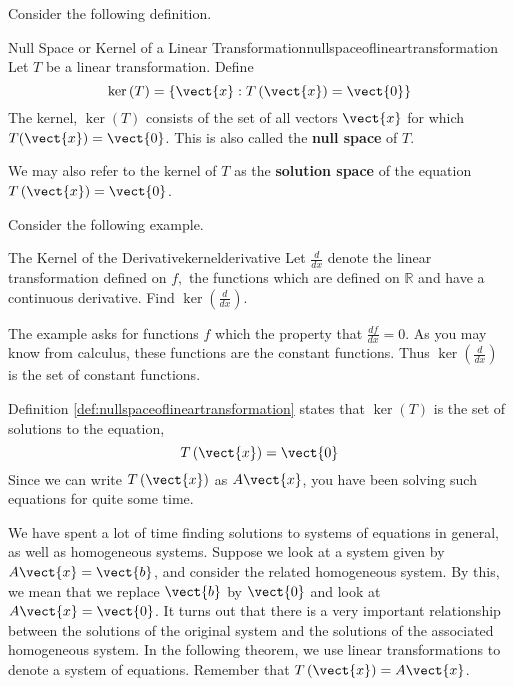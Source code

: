 Consider the following definition.

\begin{definition}{Null Space or Kernel of a Linear Transformation}{nullspaceoflineartransformation}
Let $T$ be a linear transformation. Define
\begin{equation*}
\ker \left( T\right) = \left\{ \vect{x}:T \left(\vect{x} \right)= \vect{0} \right\} 
\end{equation*}
The kernel,  $\ker \left( T\right) $ consists of the set of all vectors $\vect{x}$ for which
$T (\vect{x}) = \vect{0}$. This is also called the
 \textbf{null space} of $T$. 
\end{definition}

We may also refer to the kernel of $T$ as the
\textbf{solution space }of the equation $T \left(\vect{x}\right) = \vect{0}$.

Consider the following example.

\begin{example}{The Kernel of the Derivative}{kernelderivative}
Let $\frac{d}{dx}$ denote the linear transformation defined on $f,$ the functions
which are defined on $\mathbb{R}$ and have a continuous derivative. Find 
$\ker \left( \frac{d}{dx}\right) .$
\end{example}

\begin{solution} The example asks for functions $f$ which the property that $\frac{df}{dx}
=0. $ As you may know from calculus, these functions are the constant functions.
Thus $\ker \left( \frac{d}{dx}\right)$ is the set of constant functions.
\end{solution} 

Definition \ref{def:nullspaceoflineartransformation} states that $\ker \left( T\right) $ is the set of
solutions to the equation,
\begin{equation*}
T\left( \vect{x} \right) = \vect{0}
\end{equation*}
Since we can write $T\left( \vect{x} \right)$ as $A\vect{x}$, you have been solving such
equations for quite some time.

We have spent a lot of time finding solutions to systems of equations in general, as well as
homogeneous systems. Suppose we look at a system given by $A\vect{x}=\vect{b}$, and consider the 
related homogeneous system. By this, we mean that we replace $\vect{b}$ by $\vect{0}$ and look at $A\vect{x}=\vect{0}$. 
It turns out that there is a very important relationship between the solutions of the original
system and the solutions of the associated homogeneous system. In the following 
theorem, we use linear transformations to denote a system of equations. Remember that
$T\left(\vect{x}\right) = A\vect{x}$.

